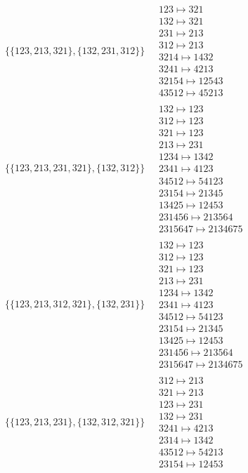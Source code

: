 \begin{scriptsize}
\begin{align}
\{\{123, 213, 321\}, \{132, 231, 312\}\}
\ 
&
\begin{matrix}
123 \mapsto 321\\132 \mapsto 321\\231 \mapsto 213\\312 \mapsto 213\\3214 \mapsto 1432\\3241 \mapsto 4213\\32154 \mapsto 12543\\43512 \mapsto 45213
\end{matrix}
\\
\{\{123, 213, 231, 321\}, \{132, 312\}\}
\ 
&
\begin{matrix}
132 \mapsto 123\\312 \mapsto 123\\321 \mapsto 123\\213 \mapsto 231\\1234 \mapsto 1342\\2341 \mapsto 4123\\34512 \mapsto 54123\\23154 \mapsto 21345\\13425 \mapsto 12453\\231456 \mapsto 213564\\2315647 \mapsto 2134675
\end{matrix}
\\
\{\{123, 213, 312, 321\}, \{132, 231\}\}
\ 
&
\begin{matrix}
132 \mapsto 123\\312 \mapsto 123\\321 \mapsto 123\\213 \mapsto 231\\1234 \mapsto 1342\\2341 \mapsto 4123\\34512 \mapsto 54123\\23154 \mapsto 21345\\13425 \mapsto 12453\\231456 \mapsto 213564\\2315647 \mapsto 2134675
\end{matrix}
\\
\{\{123, 213, 231\}, \{132, 312, 321\}\}
\ 
&
\begin{matrix}
312 \mapsto 213\\321 \mapsto 213\\123 \mapsto 231\\132 \mapsto 231\\3241 \mapsto 4213\\2314 \mapsto 1342\\43512 \mapsto 54213\\23154 \mapsto 12453

\end{matrix}
\end{align}
\end{scriptsize}
